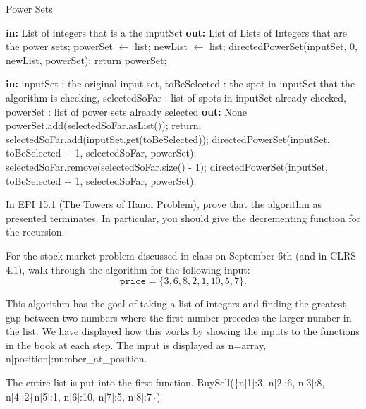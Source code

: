 \documentclass{article}
\begin{document}
  	\begin{algorithm}
	\caption{Power Sets}\label{power sets}
        \begin{algorithmic}[1]
		 \State \textbf{in:} List of integers that is a the inputSet
		 \State \textbf{out: } List of Lists of Integers that are the power sets;  
		 \State powerSet $\gets$ list;
		 \State newList $\gets$ list;
		 \State directedPowerSet(inputSet, 0, newList, powerSet);
		 \State return powerSet;
		 \EndProcedure
		 
		 	\State \textbf{in:} inputSet : the original input set, toBeSelected : the spot in inputSet that the algorithm is checking, selectedSoFar : list of spots in inputSet already checked, powerSet : list of power sets already selected
			\State \textbf{out: } None
				\State powerSet.add(selectedSoFar.asList());
				\State return;
			\EndIf
			\State selectedSoFar.add(inputSet.get(toBeSelected)); 
			\State directedPowerSet(inputSet, toBeSelected + 1, selectedSoFar, powerSet);
			\State selectedSoFar.remove(selectedSoFar.size() - 1);
			\State directedPowerSet(inputSet, toBeSelected + 1, selectedSoFar, powerSet);
		 \EndProcedure
	\end{algorithmic}
	\end{algorithm}


\nextprob
In EPI 15.1 (The Towers of Hanoi Problem), prove that the algorithm as presented
terminates.  In particular, you should give the decrementing function for the
recursion.

\nextprob
For the stock market problem discussed in class on September 6th (and in CLRS
4.1), walk through
the algorithm for the following input:
$$\mathtt{price} = \{ 3, 6, 8, 2, 1, 10, 5, 7 \}. $$

This algorithm has the goal of taking a list of integers and finding the greatest gap between two numbers where the first number precedes the larger number in the list. We have displayed how this works by showing the inputs to the functions in the book at each step. The input is displayed as n=array, n[position]:number_at_position.

The entire list is put into the first function.
BuySell(\{n[1]:3, n[2]:6, n[3]:8, n[4]:2\{n[5]:1, n[6]:10, n[7]:5, n[8]:7\})\newline
\end{document}
